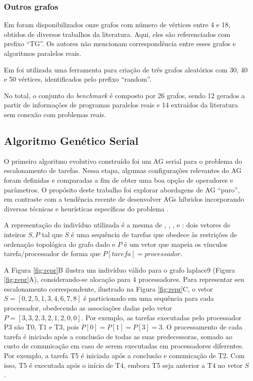 \documentclass[fleqn,10pt]{SelfArx} %
\begin{document}
\subsubsection{Outros grafos}

Em \cite{Morady} foram disponibilizados onze grafos com número de vértices entre 4 e 18, obtidos de diversos trabalhos da literatura. Aqui, eles são referenciados com prefixo ``TG''. Os autores não mencionam correspondência entre esses grafos e algoritmos paralelos reais.

Em \cite{murillo} foi utilizada uma ferramenta para criação de três grafos aleatórios com 30, 40 e 50 vértices, identificados pelo prefixo ``random''.

No total, o conjunto do \textit{benchmark} é composto por 26 grafos, sendo 12 gerados a partir de informações de programas paralelos reais e 14 extraídos da literatura sem conexão com problemas reais.


\subsection{Algoritmo Genético Serial}

O primeiro algoritmo evolutivo construído foi um AG serial para o problema do escalonamento de tarefas. Nessa etapa, algumas configurações relevantes do AG foram definidas e comparadas a fim de obter uma boa opção de operadores e parâmetros. O propósito deste trabalho foi explorar abordagens de AG ``puro'', em contraste com a tendência recente de desenvolver AGs híbridos incorporando diversas técnicas e heurísticas específicas do problema \cite{Kaur_heuristicsbased,WANG19978,OMARA201013,XU2014255,Kwok:1997:ESA:274066.274077}.

A representação do indivíduo utilizada é a mesma de \cite{WANG19978}, \cite{OMARA201013}, \cite{CHITRA20112725}, e \cite{Morady}: dois vetores de inteiros \(S,P\) tal que \(S\) é uma sequência de tarefas que obedece às restrições de ordenação topológica do grafo dado e \(P\) é um vetor que mapeia os vínculos tarefa/processador de forma que \(P[tarefa] = processador\).



A Figura \ref{fig:repr}B ilustra um indivíduo válido para o grafo laplace9 (Figura \ref{fig:repr}A), considerando-se alocação para 4 processadores. Para representar seu escalonamento correspondente, ilustrado na Figura \ref{fig:repr}C, o vetor \(S = [0,2,5,1,3,4,6,7,8]\) é particionado em uma sequência para cada processador, obedecendo as associações dadas pelo vetor \(P = [3,3,2,3,2,1,2,0,0]\). Por exemplo, as tarefas executadas pelo processador P3 são T0, T1 e T3, pois \(P[0] = P[1] = P[3] = 3\). O processamento de cada tarefa é iniciado após a conclusão de todas as suas predecessoras, somado ao custo de comunicação em caso de serem executadas em processadores diferentes. Por exemplo, a tarefa T5 é iniciada após a conclusão e comunicação de T2. Com isso, T5 é executada após o início de T4, embora T5 seja anterior a T4 no vetor \(S\).
\end{document}
